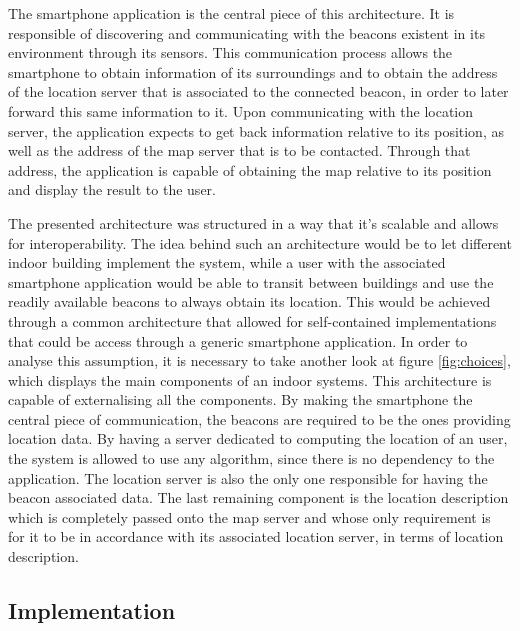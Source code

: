 \documentclass[a4paper]{IEEEtran}
\begin{document}
 
 
 
The smartphone application is the central piece of this architecture. It is responsible of discovering and communicating with the beacons existent in its environment through its sensors. This communication process allows the smartphone to obtain information of its surroundings and to obtain the address of the location server that is associated to the connected beacon, in order to later forward this same information to it. Upon communicating with the location server, the application expects to get back information relative to its position, as well as the address of the map server that is to be contacted. Through that address, the application is capable of obtaining the map relative to its position and display the result to the user. 
 
 
The presented architecture was structured in a way that it's scalable and allows for interoperability. The idea behind such an architecture would be to let different indoor building implement the system, while a user with the associated smartphone application would be able to transit between buildings and use the readily available beacons to always obtain its location. This would be achieved through a common architecture that allowed for self-contained implementations that could be access through a generic smartphone application. In order to analyse this assumption, it is necessary to take another look at figure \ref{fig:choices}, which displays the main components of an indoor systems. This architecture is capable of externalising all the components. By making the smartphone the central piece of communication, the beacons are required to be the ones providing location data. By having a server dedicated to computing the location of an user, the system is allowed to use any algorithm, since there is no dependency to the application. The location server is also the only one responsible for having the beacon associated data. The last remaining component is the location description which is completely passed onto the map server and whose only requirement is for it to be in accordance with its associated location server, in terms of location description. 
 
 
 
 
\subsection{Implementation} 
\label{sec:struture} 
 
\end{document}
